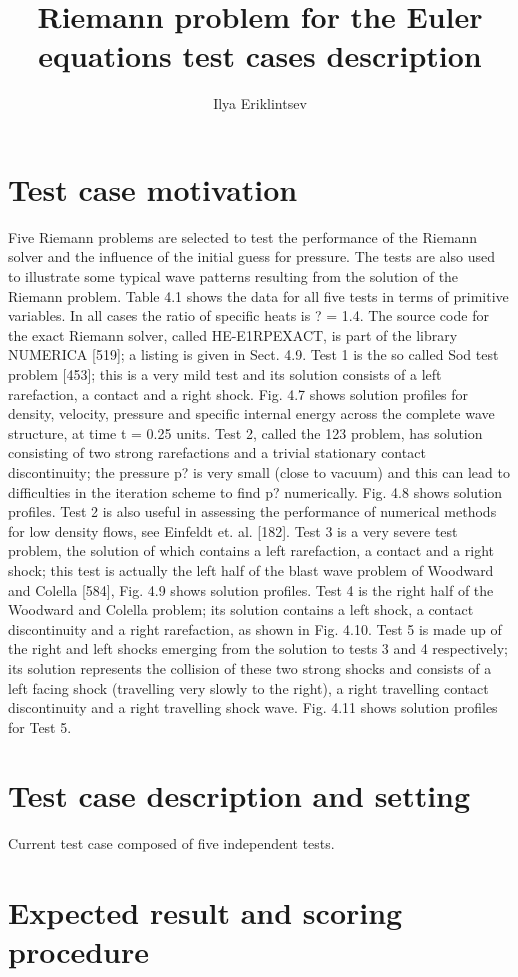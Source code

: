 \documentclass[10pt,a4paper]{article}
\author{Ilya Eriklintsev}
\title{Riemann problem for the Euler equations test cases description}
\begin{document}
\section{Test case motivation}
Five Riemann problems are selected to test the performance of the Riemann
solver and the influence of the initial guess for pressure. The tests are
also used to illustrate some typical wave patterns resulting from the solution
of the Riemann problem. Table 4.1 shows the data for all five tests in terms
of primitive variables. In all cases the ratio of specific heats is ? = 1.4. The
source code for the exact Riemann solver, called HE-E1RPEXACT, is part of
the library NUMERICA [519]; a listing is given in Sect. 4.9.
Test 1 is the so called Sod test problem [453]; this is a very mild test and
its solution consists of a left rarefaction, a contact and a right shock. Fig.
4.7 shows solution profiles for density, velocity, pressure and specific internal
energy across the complete wave structure, at time t = 0.25 units. Test 2,
called the 123 problem, has solution consisting of two strong rarefactions and
a trivial stationary contact discontinuity; the pressure p? is very small (close
to vacuum) and this can lead to difficulties in the iteration scheme to find p?
numerically. Fig. 4.8 shows solution profiles. Test 2 is also useful in assessing
the performance of numerical methods for low density flows, see Einfeldt et.
al. [182]. Test 3 is a very severe test problem, the solution of which contains a
left rarefaction, a contact and a right shock; this test is actually the left half
of the blast wave problem of Woodward and Colella [584], Fig. 4.9 shows solution
profiles. Test 4 is the right half of the Woodward and Colella problem; its
solution contains a left shock, a contact discontinuity and a right rarefaction,
as shown in Fig. 4.10. Test 5 is made up of the right and left shocks emerging
from the solution to tests 3 and 4 respectively; its solution represents the collision
of these two strong shocks and consists of a left facing shock (travelling
very slowly to the right), a right travelling contact discontinuity and a right
travelling shock wave. Fig. 4.11 shows solution profiles for Test 5.
\section{Test case description and setting}
Current test case composed of five independent tests.
\section{Expected result and scoring procedure}
\end{document}
